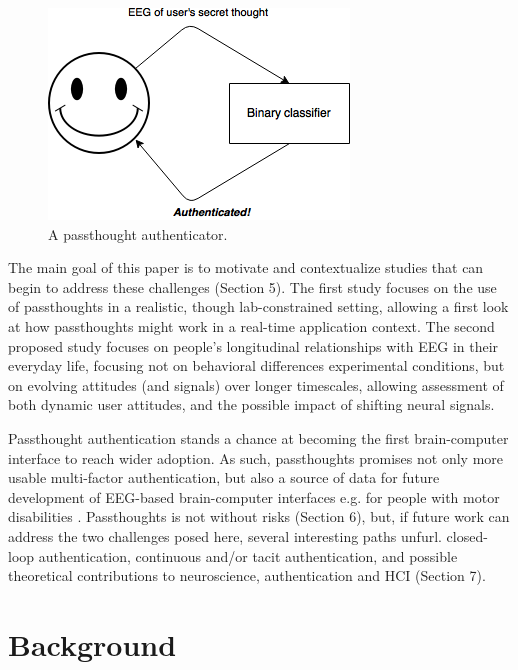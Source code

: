 \documentclass[sigconf]{acmart}
\begin{document}
\label{fig:diagram}
\begin{figure}[htbp]
\centering
\includegraphics[width=.9\linewidth]{./figures/passthoughts-diagram.png}
\caption{A passthought authenticator.}
\end{figure}

The main goal of this paper is to motivate and contextualize studies that can begin to address these challenges (Section 5).
The first study focuses on the use of passthoughts in a realistic, though lab-constrained setting, 
allowing a first look at how passthoughts might work in a real-time application context.
The second proposed study focuses on people's longitudinal relationships with EEG in their everyday life,
focusing not on behavioral differences experimental conditions, but on evolving attitudes (and signals) over longer timescales,
allowing assessment of both dynamic user attitudes, and the possible impact of shifting neural signals.

Passthought authentication stands a chance at becoming the first brain-computer interface to reach wider adoption. 
As such, passthoughts promises not only more usable multi-factor authentication,
but also a source of data for future development of EEG-based brain-computer interfaces
e.g. for people with motor disabilities \cite{Mattia2013}.
Passthoughts is not without risks (Section 6),
but, if future work can address the two challenges posed here, several interesting paths unfurl.
closed-loop authentication, continuous and/or tacit authentication, 
and possible theoretical contributions to neuroscience, authentication and HCI (Section 7).

\section{Background}
\label{sec:org841d0eb}
\end{document}
